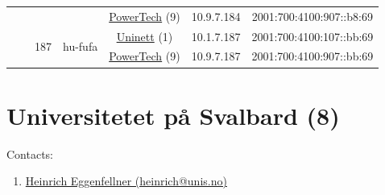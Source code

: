 \begin{small}
\begin{center}
\begin{longtable}{|c|c|c|c|c|c|c|c|}
  &  &  &  & \multicolumn{2}{|c|}{\tiny{\href{http://www.powertech.no}{PowerTech} (9)}} & \tiny{10.9.7.184} & \tiny{2001:700:4100:907::b8:69} \\* \cline{3-3}\cline{4-4}\cline{5-5}\cline{6-6}\cline{7-7}\cline{8-8}
  &  & \multirow{2}{*}{\tiny{187}} & \multicolumn{1}{|l|}{\multirow{2}{*}{\tiny{hu-fufa}}} & \multicolumn{2}{|c|}{\tiny{\href{https://www.uninett.no}{Uninett} (1)}} & \tiny{10.1.7.187} & \tiny{2001:700:4100:107::bb:69} \\* \cline{5-5}\cline{6-6}\cline{7-7}\cline{8-8}
  &  &  &  & \multicolumn{2}{|c|}{\tiny{\href{http://www.powertech.no}{PowerTech} (9)}} & \tiny{10.9.7.187} & \tiny{2001:700:4100:907::bb:69} \\ \hline
\end{longtable}
\end{center}
\end{small}



\section{Universitetet på Svalbard (8)}
\label{sec:UNIS}

Contacts:\begin{enumerate}
 \item {}\href{mailto:heinrich@unis.no}{Heinrich Eggenfellner (heinrich@unis.no)}
\end{enumerate}

